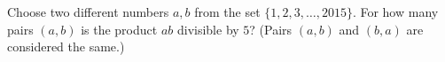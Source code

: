 Choose two different numbers $a, b$ from the set $\{1, 2, 3, \ldots, 2015\}$. For how many pairs $(a,b)$ is the product $ab$ divisible by $5$? (Pairs $(a,b)$ and $(b,a)$ are considered the same.)

